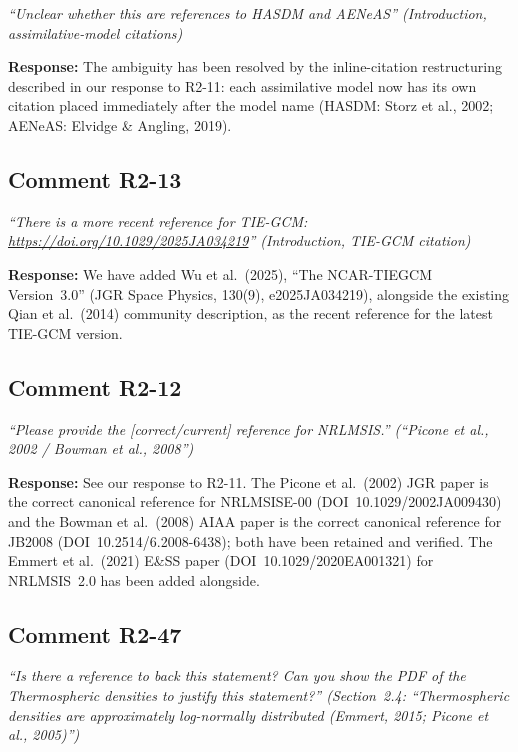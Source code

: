 \documentclass[11pt]{article}
\newcommand{\reviewercomment}[1]{%
  \medskip
  \noindent\textit{\color{reviewblue}#1}%
  \medskip
}
\begin{document}
\reviewercomment{%
``Unclear whether this are references to HASDM and AENeAS''
(Introduction, assimilative-model citations)}

\textbf{Response:}
The ambiguity has been resolved by the inline-citation restructuring
described in our response to R2-11: each assimilative model now has
its own citation placed immediately after the model name (HASDM:
Storz et al., 2002; AENeAS: Elvidge \& Angling, 2019).


\subsection{Comment R2-13}

\reviewercomment{%
``There is a more recent reference for TIE-GCM:
\url{https://doi.org/10.1029/2025JA034219}''
(Introduction, TIE-GCM citation)}

\textbf{Response:}
We have added Wu et al.\ (2025), ``The NCAR-TIEGCM Version~3.0''
(JGR Space Physics, 130(9), e2025JA034219), alongside the existing
Qian et al.\ (2014) community description, as the recent reference for
the latest TIE-GCM version.


\subsection{Comment R2-12}

\reviewercomment{%
``Please provide the [correct/current] reference for NRLMSIS.''
(``Picone et al., 2002 / Bowman et al., 2008'')}

\textbf{Response:}
See our response to R2-11. The Picone et al.\ (2002) JGR paper is the
correct canonical reference for NRLMSISE-00 (DOI~10.1029/2002JA009430)
and the Bowman et al.\ (2008) AIAA paper is the correct canonical
reference for JB2008 (DOI~10.2514/6.2008-6438); both have been
retained and verified. The Emmert et al.\ (2021) E\&SS paper
(DOI~10.1029/2020EA001321) for NRLMSIS~2.0 has been added alongside.


\subsection{Comment R2-47}

\reviewercomment{%
``Is there a reference to back this statement? Can you show the PDF of the
\emph{Thermospheric densities} to justify this statement?''
\;(Section~2.4: ``Thermospheric densities are approximately log-normally
distributed (Emmert, 2015; Picone et al., 2005)'')}
\end{document}
